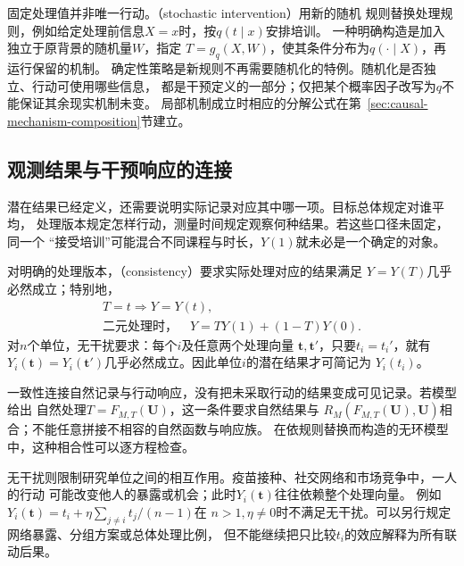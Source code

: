 固定处理值并非唯一行动。（stochastic intervention）用新的随机
规则替换处理规则，例如给定处理前信息\(X=x\)时，按\(q(t\mid x)\)安排培训。
一种明确构造是加入独立于原背景的随机量\(W\)，指定
\(T=g_q(X,W)\)，使其条件分布为\(q(\cdot\mid X)\)，再运行保留的机制。
确定性策略是新规则不再需要随机化的特例。随机化是否独立、行动可使用哪些信息，
都是干预定义的一部分；仅把某个概率因子改写为\(q\)不能保证其余现实机制未变。
局部机制成立时相应的分解公式在第~\ref{sec:causal-mechanism-composition}节建立。

\subsection{观测结果与干预响应的连接}
\label{sec:causal-response-observation-link}

潜在结果已经定义，还需要说明实际记录对应其中哪一项。目标总体规定对谁平均，
处理版本规定怎样行动，测量时间规定观察何种结果。若这些口径未固定，同一个
“接受培训”可能混合不同课程与时长，\(Y(1)\)就未必是一个确定的对象。

\begin{definition}[处理一致性与无干扰]
  \label{def:causal-consistency-no-interference}
  对明确的处理版本，（consistency）要求实际处理对应的结果满足
  \(Y=Y(T)\)几乎必然成立；特别地，
  \begin{equation}
    \begin{gathered}
      T=t\Longrightarrow Y=Y(t),\\
      \text{二元处理时，}\quad Y=TY(1)+(1-T)Y(0).
    \end{gathered}
    \label{eq:causal-consistency}
  \end{equation}
  对\(n\)个单位，无干扰要求：每个\(i\)及任意两个处理向量
  \(\bm t,\bm t'\)，只要\(t_i=t_i'\)，就有
  \(Y_i(\bm t)=Y_i(\bm t')\)几乎必然成立。因此单位\(i\)的潜在结果才可简记为
  \(Y_i(t_i)\)。
\end{definition}

一致性连接自然记录与行动响应，没有把未采取行动的结果变成可见记录。若模型给出
自然处理\(T=F_{M,T}(\bm U)\)，这一条件要求自然结果与
\(R_M(F_{M,T}(\bm U),\bm U)\)相合；不能任意拼接不相容的自然函数与响应族。
在依规则替换而构造的无环模型中，这种相合性可以逐方程检查。

无干扰则限制研究单位之间的相互作用。疫苗接种、社交网络和市场竞争中，一人的行动
可能改变他人的暴露或机会；此时\(Y_i(\bm t)\)往往依赖整个处理向量。
例如\(Y_i(\bm t)=t_i+\eta\sum_{j\ne i}t_j/(n-1)\)在
\(n>1,\eta\ne0\)时不满足无干扰。可以另行规定网络暴露、分组方案或总体处理比例，
但不能继续把只比较\(t_i\)的效应解释为所有联动后果。

